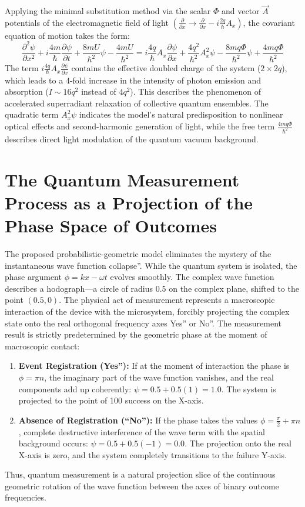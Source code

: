 \documentclass{article}
\begin{document}
Applying the minimal substitution method via the scalar $\Phi$ and vector $\vec{A}$ potentials of the electromagnetic field of light $\left(\frac{\partial}{\partial x} \to \frac{\partial}{\partial x} - i\frac{2q}{\hbar}A_x\right)$, the covariant equation of motion takes the form:\begin{equation}
\frac{\partial^2\psi}{\partial x^2}
+ i\frac{4m}{\hbar}\frac{\partial\psi}{\partial t}
+ \frac{8mU}{\hbar^2}\psi
- \frac{4mU}{\hbar^2}
=
i\frac{4q}{\hbar}A_x \frac{\partial\psi}{\partial x}
+ \frac{4q^2}{\hbar^2}A_x^2\psi
- \frac{8mq\Phi}{\hbar^2}\psi
+ \frac{4mq\Phi}{\hbar^2}
\end{equation}The term $i\frac{4q}{\hbar}A_x \frac{\partial\psi}{\partial x}$ contains the effective doubled charge of the system ($2 \times 2q$), which leads to a 4-fold increase in the intensity of photon emission and absorption ($I \sim 16q^2$ instead of $4q^2$). This describes the phenomenon of accelerated superradiant relaxation of collective quantum ensembles. The quadratic term $A_x^2\psi$ indicates the model's natural predisposition to nonlinear optical effects and second-harmonic generation of light, while the free term $\frac{4mq\Phi}{\hbar^2}$ describes direct light modulation of the quantum vacuum background.

\section{The Quantum Measurement Process as a Projection of the Phase Space of Outcomes}The proposed probabilistic-geometric model eliminates the mystery of the instantaneous wave function collapse''. While the quantum system is isolated, the phase argument $\phi = kx - \omega t$ evolves smoothly. The complex wave function describes a hodograph—a circle of radius 0.5 on the complex plane, shifted to the point $(0.5, 0)$. The physical act of measurement represents a macroscopic interaction of the device with the microsystem, forcibly projecting the complex state onto the real orthogonal frequency axes Yes'' or No''. The measurement result is strictly predetermined by the geometric phase at the moment of macroscopic contact: \begin{enumerate} \item \textbf{Event Registration (Yes''):} If at the moment of interaction the phase is $\phi = \pi n$, the imaginary part of the wave function vanishes, and the real components add up coherently: $\psi = 0.5 + 0.5(1) = 1.0$. The system is projected to the point of 100 success on the X-axis.\item \textbf{Absence of Registration (``No''):} If the phase takes the values $\phi = \frac{\pi}{2} + \pi n$, complete destructive interference of the wave term with the spatial background occurs: $\psi = 0.5 + 0.5(-1) = 0.0$. The projection onto the real X-axis is zero, and the system completely transitions to the failure Y-axis.\end{enumerate}Thus, quantum measurement is a natural projection slice of the continuous geometric rotation of the wave function between the axes of binary outcome frequencies.
\end{document}
